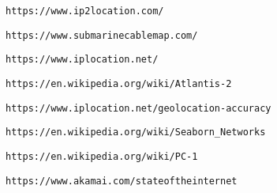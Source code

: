 \begin{thebibliography}{99}

  \texttt{https://www.ip2location.com/}

	\texttt{https://www.submarinecablemap.com/}

	\texttt{https://www.iplocation.net/}

	\texttt{https://en.wikipedia.org/wiki/Atlantis-2}

	\texttt{https://www.iplocation.net/geolocation-accuracy}

	\texttt{https://en.wikipedia.org/wiki/Seaborn\_Networks}

	\texttt{https://en.wikipedia.org/wiki/PC-1}

	\texttt{https://www.akamai.com/stateoftheinternet}

\end{thebibliography}